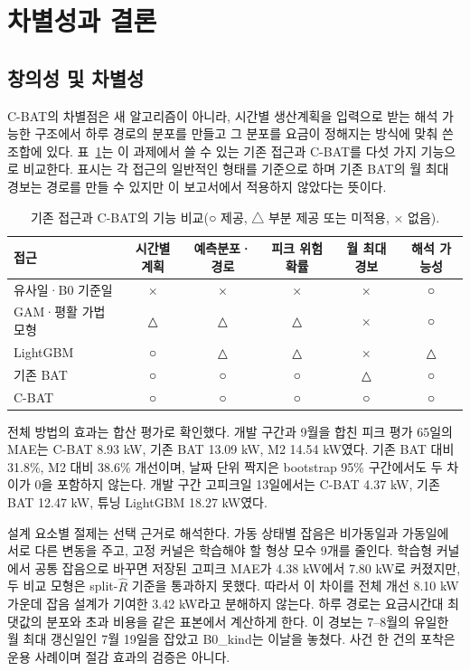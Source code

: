 \section{차별성과 결론}

\subsection{창의성 및 차별성}

C-BAT의 차별점은 새 알고리즘이 아니라, 시간별 생산계획을 입력으로 받는 해석 가능한 구조에서 하루 경로의 분포를 만들고 그 분포를 요금이 정해지는 방식에 맞춰 쓴 조합에 있다. 표~\ref{tab:ch6-compare}는 이 과제에서 쓸 수 있는 기존 접근과 C-BAT를 다섯 가지 기능으로 비교한다. 표시는 각 접근의 일반적인 형태를 기준으로 하며 기존 BAT의 월 최대 경보는 경로를 만들 수 있지만 이 보고서에서 적용하지 않았다는 뜻이다.

\begin{table}[h]
\centering
\caption{기존 접근과 C-BAT의 기능 비교(○ 제공, △ 부분 제공 또는 미적용, × 없음).}
\label{tab:ch6-compare}
\setlength{\tabcolsep}{4pt}
\small
\begin{tabular}{lccccc}
\toprule
접근 & 시간별 계획 & 예측분포·경로 & 피크 위험확률 & 월 최대 경보 & 해석 가능성 \\
\midrule
유사일·B0 기준일 & × & × & × & × & ○ \\
GAM·평활 가법모형 \citep{hyndman2010peak} & △ & △ & △ & × & ○ \\
LightGBM \citep{ke2017lightgbm} & ○ & △ & △ & × & △ \\
기존 BAT & ○ & ○ & ○ & △ & ○ \\
C-BAT & ○ & ○ & ○ & ○ & ○ \\
\bottomrule
\end{tabular}
\end{table}

전체 방법의 효과는 합산 평가로 확인했다. 개발 구간과 9월을 합친 피크 평가 65일의 MAE는 C-BAT 8.93 kW, 기존 BAT 13.09 kW, M2 14.54 kW였다. 기존 BAT 대비 31.8\%, M2 대비 38.6\% 개선이며, 날짜 단위 짝지은 bootstrap 95\% 구간에서도 두 차이가 0을 포함하지 않는다. 개발 구간 고피크일 13일에서는 C-BAT 4.37 kW, 기존 BAT 12.47 kW, 튜닝 LightGBM 18.27 kW였다.

설계 요소별 절제는 선택 근거로 해석한다. 가동 상태별 잡음은 비가동일과 가동일에 서로 다른 변동을 주고, 고정 커널은 학습해야 할 형상 모수 9개를 줄인다. 학습형 커널에서 공통 잡음으로 바꾸면 저장된 고피크 MAE가 4.38 kW에서 7.80 kW로 커졌지만, 두 비교 모형은 split-$\hat R$ 기준을 통과하지 못했다. 따라서 이 차이를 전체 개선 8.10 kW 가운데 잡음 설계가 기여한 3.42 kW라고 분해하지 않는다. 하루 경로는 요금시간대 최댓값의 분포와 초과 비용을 같은 표본에서 계산하게 한다. 이 경보는 7--8월의 유일한 월 최대 갱신일인 7월 19일을 잡았고 B0\_kind는 이날을 놓쳤다. 사건 한 건의 포착은 운용 사례이며 절감 효과의 검증은 아니다.

